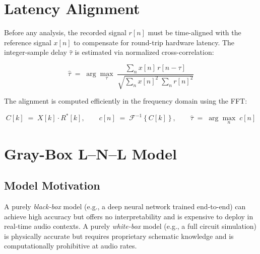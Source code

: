 \documentclass[11pt, letterpaper]{article}
\begin{document}

\section{Latency Alignment}
\label{sec:latency}

Before any analysis, the recorded signal $r[n]$ must be time-aligned with the
reference signal $x[n]$ to compensate for round-trip hardware latency.
The integer-sample delay $\hat{\tau}$ is estimated via normalized
cross-correlation:

\begin{equation}
    \hat{\tau} \;=\; \arg\max_{\tau} \;
    \frac{\displaystyle\sum_{n} x[n]\, r[n - \tau]}
         {\sqrt{\displaystyle\sum_{n} x[n]^{2}\;
                \displaystyle\sum_{n} r[n]^{2}}}
    \label{eq:xcorr}
\end{equation}

The alignment is computed efficiently in the frequency domain using the FFT:

\begin{equation}
    C[k] \;=\; X[k] \cdot R^{*}[k],
    \qquad
    c[n] \;=\; \mathcal{F}^{-1}\!\left\{C[k]\right\},
    \qquad
    \hat{\tau} \;=\; \arg\max_{n}\; c[n]
    \label{eq:xcorr_fft}
\end{equation}


\section{Gray-Box L--N--L Model}
\label{sec:lnl}

\subsection{Model Motivation}
\label{sec:lnl_motivation}

A purely \emph{black-box} model (e.g., a deep neural network trained end-to-end)
can achieve high accuracy but offers no interpretability and is expensive to
deploy in real-time audio contexts.  A purely \emph{white-box} model (e.g., a
full circuit simulation) is physically accurate but requires proprietary
schematic knowledge and is computationally prohibitive at audio rates.
\end{document}
